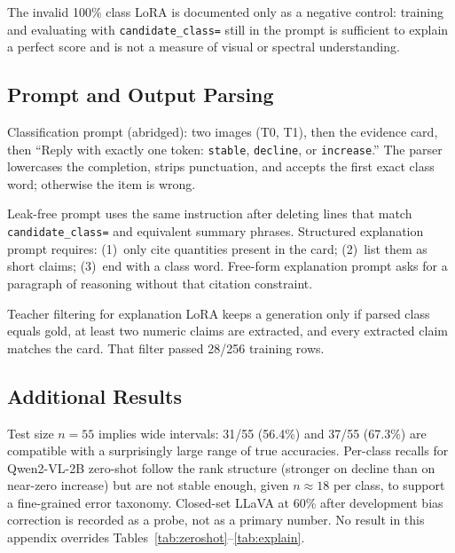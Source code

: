 \documentclass[11pt]{article}
\begin{document}
The invalid 100\% class LoRA is documented only as a negative
control: training and evaluating with \texttt{candidate\_class=}
still in the prompt is sufficient to explain a perfect score and is
not a measure of visual or spectral understanding.

\subsection{Prompt and Output Parsing}

Classification prompt (abridged): two images (T0, T1), then the
evidence card, then ``Reply with exactly one token:
\texttt{stable}, \texttt{decline}, or \texttt{increase}.''
The parser lowercases the completion, strips punctuation, and
accepts the first exact class word; otherwise the item is wrong.

Leak-free prompt uses the same instruction after deleting lines
that match \texttt{candidate\_class=} and equivalent summary
phrases. Structured explanation prompt requires: (1)~only cite
quantities present in the card; (2)~list them as short claims;
(3)~end with a class word. Free-form explanation prompt asks for
a paragraph of reasoning without that citation constraint.

Teacher filtering for explanation LoRA keeps a generation only if
parsed class equals gold, at least two numeric claims are extracted,
and every extracted claim matches the card. That filter passed
28/256 training rows.

\subsection{Additional Results}

Test size $n=55$ implies wide intervals: 31/55 (56.4\%) and 37/55
(67.3\%) are compatible with a surprisingly large range of true
accuracies. Per-class recalls for Qwen2-VL-2B zero-shot follow the
rank structure (stronger on decline than on near-zero increase)
but are not stable enough, given $n\approx 18$ per class, to
support a fine-grained error taxonomy. Closed-set LLaVA at 60\%
after development bias correction is recorded as a probe, not as a
primary number. No result in this appendix overrides
Tables~\ref{tab:zeroshot}--\ref{tab:explain}.
\end{document}

